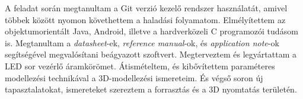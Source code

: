 \documentclass[../main.tex]{subfiles}
\begin{document}
        A feladat során megtanultam a Git verzió kezelő rendszer használatát, amivel többek között nyomon követhettem a haladási folyamatom.
        Elmélyítettem az objektumorientált Java, Android, illetve a hardverközeli C programozói tudásom is. Megtanultam a \textit{datasheet}-ek, \textit{reference manual}-ok, és \textit{application note}-ok segítségével megvalósítani beágyazott szoftvert. Megterveztem és legyártattam a LED sor vezérlő áramkörömet. Átismételtem, és kibővítettem paraméteres modellezési technikával a 3D-modellezési ismereteim.
        És végső soron új tapasztalatokat, ismereteket szereztem a forrasztás és a 3D nyomtatás területén. 
        
        
    

    
\end{document}
